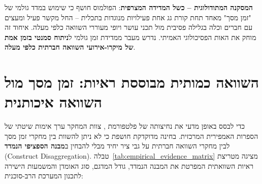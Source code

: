 \textbf{המסקנה המתודולוגית -- כשל המדידה המצרפית}: הפולמוס חושף כי שימוש במדד גולמי של "זמן מסך" מאחד תחת קורת גג אחת פעילויות מנוגדות בתכלית -- החל מקשר פעיל ומעצים עם חברים וכלה בגלילה פסיבית מול תכני עושר ויופי מעוררי השוואה כלפי מעלה. איחוד זה מוחק את האות הפסיכולוגי האמיתי. נדרש מעבר ממדידת זמן גולמי ל\textbf{ניתוח סמנטי בזמן אמת של מיקרו-אירועי השוואה חברתית כלפי מעלה}.

\section{השוואה כמותית מבוססת ראיות: זמן מסך מול השוואה איכותנית}
\label{sec:gaps_evidence_chart}
כדי לבסס באופן מדעי את נחיצותה של פלטפורמת \projectname{}, צוות המחקר ערך אימות שיטתי של הספרות האמפירית המרכזית. בחינה מדוקדקת חושפת כי לא ניתן להשוות בין מחקרי זמן מסך לבין מחקרי השוואה חברתית על גבי ציר יחיד מבלי להבחין ב\textbf{מבנה הספציפי הנמדד} (\textenglish{Construct Disaggregation}). טבלה~\ref{tab:empirical_evidence_matrix} מציגה מטריצת ראיות השוואתית המפרטת את המבנה הנמדד, גודל המדגם, סוג האומדן והמשמעות הישירה לתכנון המערכת הרב-סוכנית:

